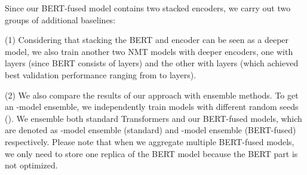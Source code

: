 \documentclass{article} \usepackage{iclr2020_conference,times}
\begin{document}

Since our BERT-fused model contains two stacked encoders, we carry out two groups of additional baselines:

\noindent(1) Considering that stacking the BERT and encoder can be seen as a deeper model, we also train another two NMT models with deeper encoders, one with  layers (since BERT consists of  layers) and the other with  layers (which achieved best validation performance ranging from  to  layers). 

\noindent(2) We also compare the results of our approach with ensemble methods. To get an -model ensemble, we independently train  models with different random seeds (). We ensemble both standard Transformers and our BERT-fused  models, which are denoted as -model ensemble (standard) and -model ensemble (BERT-fused) respectively. Please note that when we aggregate multiple BERT-fused  models, we only need to store one replica of the BERT model because the BERT part is not optimized.
\end{document}
